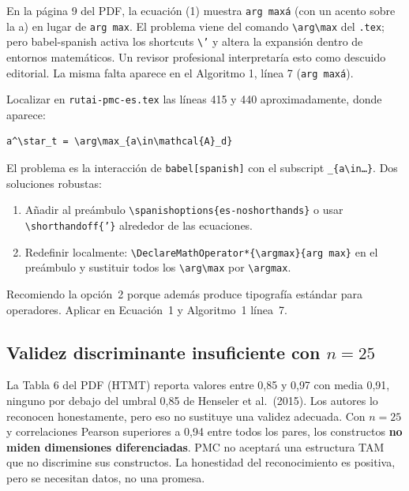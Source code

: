 \documentclass[11pt,a4paper]{article}
\begin{document}
\begin{deficiencia}[B.2 --- Deficiencia]
En la p\'agina 9 del PDF, la ecuaci\'on (1) muestra \texttt{arg max\'{a}} (con un acento sobre la a) en lugar de \texttt{arg\,max}. El problema viene del comando \texttt{\textbackslash arg\textbackslash max} del \texttt{.tex}; pero babel-spanish activa los shortcuts \texttt{\textbackslash '} y altera la expansi\'on dentro de entornos matem\'aticos. Un revisor profesional interpretar\'ia esto como descuido editorial. La misma falta aparece en el Algoritmo 1, l\'inea 7 (\texttt{arg max\'{a}}).
\end{deficiencia}

\begin{abordaje}
Localizar en \texttt{rutai-pmc-es.tex} las l\'ineas 415 y 440 aproximadamente, donde aparece:
\begin{verbatim}
a^\star_t = \arg\max_{a\in\mathcal{A}_d}
\end{verbatim}
El problema es la interacci\'on de \texttt{babel[spanish]} con el subscript \texttt{\_\{a\textbackslash in\ldots\}}. Dos soluciones robustas:

\begin{enumerate}
  \item A\~nadir al pre\'ambulo \texttt{\textbackslash spanishoptions\{es-noshorthands\}} o usar \texttt{\textbackslash shorthandoff\{'\}} alrededor de las ecuaciones.
  \item Redefinir localmente: \texttt{\textbackslash DeclareMathOperator*\{\textbackslash argmax\}\{arg\,max\}} en el pre\'ambulo y sustituir todos los \texttt{\textbackslash arg\textbackslash max} por \texttt{\textbackslash argmax}.
\end{enumerate}

Recomiendo la opci\'on~2 porque adem\'as produce tipograf\'ia est\'andar para operadores. Aplicar en Ecuaci\'on~1 y Algoritmo~1 l\'inea~7.
\end{abordaje}

\subsection{Validez discriminante insuficiente con \texorpdfstring{$n=25$}{n=25}}

\begin{deficiencia}[B.3 --- Deficiencia]
La Tabla 6 del PDF (HTMT) reporta valores entre 0{,}85 y 0{,}97 con media 0{,}91, ninguno por debajo del umbral 0{,}85 de Henseler et al.~(2015). Los autores lo reconocen honestamente, pero eso no sustituye una validez adecuada. Con $n=25$ y correlaciones Pearson superiores a 0{,}94 entre todos los pares, los constructos \textbf{no miden dimensiones diferenciadas}. PMC no aceptar\'a una estructura TAM que no discrimine sus constructos. La honestidad del reconocimiento es positiva, pero se necesitan datos, no una promesa.
\end{deficiencia}
\end{document}
